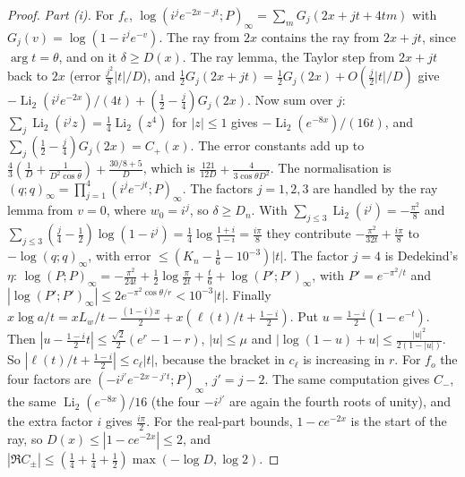 \begin{proof}
\emph{Part \textup{(i)}.} For $f_e$, $\log(i^je^{-2x-jt};P)_\infty=\sum_mG_j(2x+jt+4tm)$ with
$G_j(v)=\log(1-i^je^{-v})$. The ray from $2x$ contains the ray from $2x+jt$, since $\arg t=\theta$, and on it
$\delta\ge D(x)$. The ray lemma, the Taylor step from $2x+jt$ back to $2x$ (error
$\frac{j^2}{8}|t|/D$), and $\frac12G_j(2x+jt)=\frac12G_j(2x)+O(\frac j2|t|/D)$ give
$-\operatorname{Li}_2(i^je^{-2x})/(4t)+(\frac12-\frac j4)G_j(2x)$. Now sum over $j$:
$\sum_j\operatorname{Li}_2(i^jz)=\frac14\operatorname{Li}_2(z^4)$ for $|z|\le1$ gives
$-\operatorname{Li}_2(e^{-8x})/(16t)$, and $\sum_j(\frac12-\frac j4)G_j(2x)=C_+(x)$. The error constants add up to
$\frac43(\frac1D+\frac1{D^2\cos\theta})+\frac{30/8+5}{D}$, which is $\frac{121}{12D}+\frac{4}{3\cos\theta D^2}$.
The normalisation is $(q;q)_\infty=\prod_{j=1}^4(i^je^{-jt};P)_\infty$. The factors $j=1,2,3$ are handled by the
ray lemma from $v=0$, where $w_0=i^j$, so $\delta\ge D_n$. With
$\sum_{j\le3}\operatorname{Li}_2(i^j)=-\frac{\pi^2}8$ and $\sum_{j\le3}(\frac j4-\frac12)\log(1-i^j)=
\frac14\log\frac{1+i}{1-i}=\frac{i\pi}8$ they contribute $-\frac{\pi^2}{32t}+\frac{i\pi}8$ to $-\log(q;q)_\infty$,
with error $\le(K_n-\frac16-10^{-3})|t|$. The factor $j=4$ is Dedekind's $\eta$:
$\log(P;P)_\infty=-\frac{\pi^2}{24t}+\frac12\log\frac\pi{2t}+\frac t6+\log(P';P')_\infty$, with
$P'=e^{-\pi^2/t}$ and $|\log(P';P')_\infty|\le2e^{-\pi^2\cos\theta/r}<10^{-3}|t|$. Finally
$x\log a/t=xL_w/t-\frac{(1-i)x}2+x(\ell(t)/t+\frac{1-i}2)$. Put $u=\frac{1-i}2(1-e^{-t})$. Then
$|u-\frac{1-i}2t|\le\frac{\sqrt2}2(e^{r}-1-r)$, $|u|\le\mu$ and $|\log(1-u)+u|\le\frac{|u|^2}{2(1-|u|)}$. So
$|\ell(t)/t+\frac{1-i}2|\le c_\ell|t|$, because the bracket in $c_\ell$ is increasing in $r$. For $f_o$ the
four factors are $(-i^{j'}e^{-2x-j't};P)_\infty$, $j'=j-2$. The same computation gives $C_-$, the same
$\operatorname{Li}_2(e^{-8x})/16$ (the four $-i^{j'}$ are again the fourth roots of unity), and the extra
factor $i$ gives $\frac{i\pi}2$. For the real-part bounds, $1-ce^{-2x}$ is the start of the ray, so
$D(x)\le|1-ce^{-2x}|\le2$, and $|\Re C_\pm|\le(\frac14+\frac14+\frac12)\max(-\log D,\log2)$.


\end{proof}
